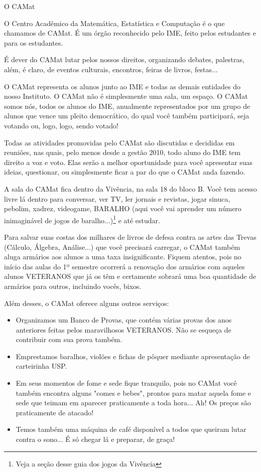 \begin{secao}{O CAMat}

O Centro Acadêmico da Matemática, Estatística e Computação é o que chamamos de
CAMat. É um órgão reconhecido pelo IME, feito pelos estudantes e para os
estudantes.

É dever do CAMat lutar pelos nossos direitos, organizando debates, palestras,
além, é claro, de eventos culturais, encontros, feiras de livros, festas...

O CAMat representa os alunos junto ao IME e todas as demais entidades do nosso
Instituto. O CAMat não é simplesmente uma sala, um espaço. O CAMat somos nós,
todos os alunos do IME, anualmente representados por um grupo de alunos que
vence um pleito democrático, do qual você também participará, seja votando ou,
logo, logo, sendo votado!

Todas as atividades promovidas pelo CAMat são discutidas e decididas em
reuniões, nas quais, pelo menos desde a gestão 2010, todo aluno do IME tem
direito a voz e voto. Elas serão a melhor oportunidade para você apresentar suas
ideias, questionar, ou simplesmente ficar a par do que o CAMat
anda fazendo.

A sala do CAMat  fica dentro da Vivência, na sala 18 do bloco B. Você tem acesso
livre lá dentro para conversar, ver TV, ler jornais e revistas, jogar sinuca,
pebolim, xadrez, videogame, BARALHO (aqui você vai aprender um número inimaginável de
jogos de baralho...)\footnote{Veja a seção desse guia dos jogos da
Vivência} e até estudar.

Para salvar suas costas dos milhares de livros de defesa contra as artes das
Trevas (Cálculo, Álgebra, Análise...) que você precisará carregar, o CAMat
também aluga armários aos alunos a uma taxa insignificante. Fiquem atentos, pois no
início das aulas do 1º semestre ocorrerá a renovação dos armários com
aqueles alunos VETERANOS que já os têm e certamente sobrará uma boa quantidade
de armários para outros, incluindo vocês, bixos.

Além desses, o CAMat oferece alguns outros serviços:

\begin{itemize}
\item Organizamos um Banco de Provas, que contém várias provas dos anos anteriores feitas
pelos maravilhosos VETERANOS. Não se esqueça de contribuir com sua prova também.
\item Emprestamos baralhos, violões e fichas de pôquer mediante apresentação de
carteirinha USP.
\item Em seus momentos de fome e sede fique tranquilo, pois no CAMat você
também encontra alguns "comes e bebes", prontos para matar aquela fome e sede
que teimam em aparecer praticamente a toda hora... Ah! Os preços são praticamente
de atacado!
\item Temos também uma máquina de café disponível a todos que queiram lutar
contra o sono... É só chegar lá e preparar, de graça!
\end{itemize}


\end{secao}
